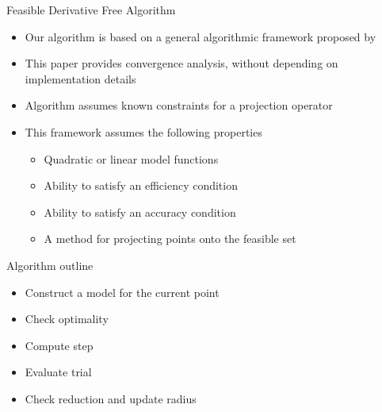 \documentclass{beamer}
\begin{document}
\begin{frame}{Feasible Derivative Free Algorithm}
    \begin{itemize}
        \item Our algorithm is based on a general algorithmic framework proposed by \cite{CONEJO2013324}
        \item This paper provides convergence analysis, without depending on implementation details
		\item Algorithm assumes known constraints for a projection operator
        \item This framework assumes the following properties
            \begin{itemize}
				\item Quadratic or linear model functions
                \item Ability to satisfy an efficiency condition
                \item Ability to satisfy an accuracy condition
                \item A method for projecting points onto the feasible set
            \end{itemize}
    \end{itemize}
\end{frame}


\begin{frame}{Algorithm outline}
	\begin{itemize}
		\item Construct a model for the current point
		\item Check optimality
		\item Compute step
		\item Evaluate trial
		\item Check reduction and update radius
	\end{itemize}
\end{frame}

% 
\end{document}
